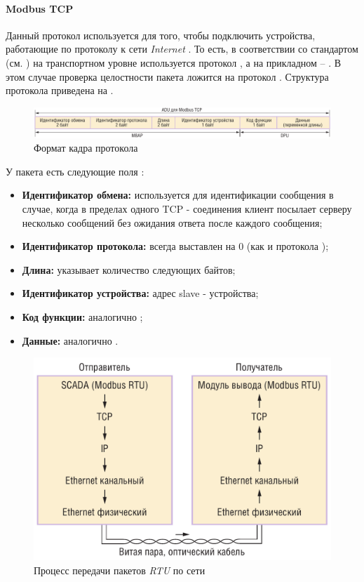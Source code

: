 \documentclass[../AISTR.tex]{subfiles}
\begin{document}
\paragraph{Modbus TCP}
Данный протокол используется для того, чтобы подключить устройства, работающие по протоколу \mb к сети \textit{Internet} \cite{__2018-1}. То есть, в соответствии со стандартом \osi (см. ) на транспортном уровне используется протокол \tcp, а на прикладном -- \mb. В этом случае проверка целостности пакета ложится на протокол \tcp. Структура протокола \mb \tcp приведена на . 
\begin{figure}[h]
	\centering
	\includegraphics[width=1\linewidth]{images/modbus_TCP}
	\caption{Формат кадра протокола \mb \tcp}
	\label{fig:modbustcp}
\end{figure}
У пакета есть следующие поля \cite{__2010}:
\begin{itemize}
	\item \textbf{Идентификатор обмена:} используется для идентификации сообщения в случае,	когда в пределах одного TCP - соединения клиент посылает серверу несколько сообщений без ожидания ответа после каждого сообщения;
	\item \textbf{Идентификатор протокола:} всегда выставлен на 0 (как и протокола \tcp);
	\item \textbf{Длина:} указывает количество следующих байтов;
	\item \textbf{Идентификатор устройства:} адрес slave - устройства;
	\item \textbf{Код функции:} аналогично ;
	\item \textbf{Данные:} аналогично .
\end{itemize}

\begin{figure}[h]
	\centering
	\includegraphics[width=0.7\linewidth]{images/modbus_tcp}
	\caption{Процесс передачи пакетов \mb \textit{RTU} по сети \tcp}
	\label{fig:modbustcp_ip}
\end{figure}
\end{document}

